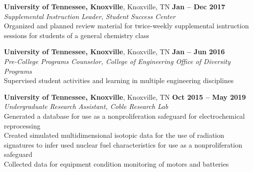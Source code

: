 \documentclass[margin,line]{resume}
\begin{document}
\begin{resume}
    \textbf{University of Tennessee, Knoxville}, Knoxville, TN \hfill \textbf{Jan -- Dec 2017}\\
                \textsl{Supplemental Instruction Leader, Student Success Center}\\
                Organized and planned review material for twice-weekly supplemental isntruction sessions 
                for students of a general chemistry class
    
    \textbf{University of Tennessee, Knoxville}, Knoxville, TN \hfill \textbf{Jan -- Jun 2016}\\
                \textsl{Pre-College Programs Counselor, College of Engineering Office of Diversity Programs}\\
                Supervised student activities and learning in multiple engineering disciplines

    \textbf{University of Tennessee, Knoxville}, Knoxville, TN \hfill \textbf{Oct 2015 -- May 2019}\\
                \textsl{Undergraduate Research Assistant, Coble Research Lab}\\
                Generated a database for use as a nonproliferation safeguard for electrochemical reprocessing \\
                Created simulated multidimensional isotopic data for the use of radiation signatures to infer used nuclear fuel characteristics for use as a nonproliferation safeguard\\ 
                Collected data for equipment condition monitoring of motors and batteries


\end{resume}
\end{document}

